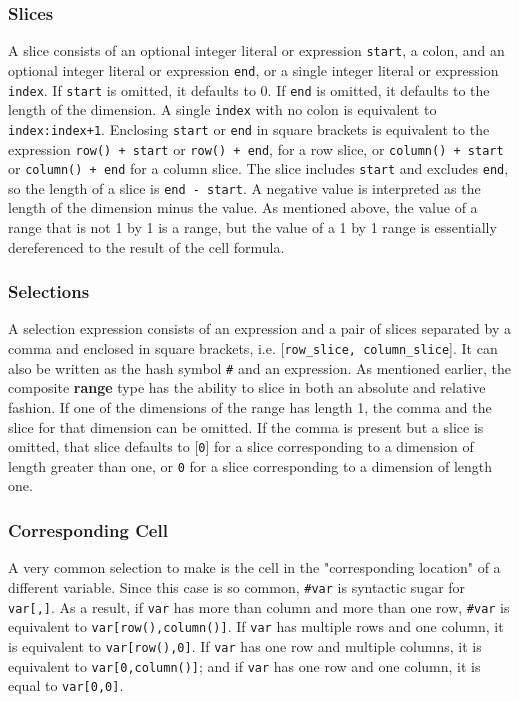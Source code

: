 \subsubsection{Slices}
A slice consists of an optional integer literal or expression \texttt{start}, a colon, and an optional integer literal or expression \texttt{end}, or a single integer literal or expression \texttt{index}. If \texttt{start} is omitted, it defaults to 0. If \texttt{end} is omitted, it defaults to the length of the dimension. A single \texttt{index} with no colon is equivalent to \texttt{index:index+1}. Enclosing \texttt{start} or \texttt{end} in square brackets is equivalent to the expression \texttt{row() + start} or \texttt{row() + end}, for a row slice, or \texttt{column() + start} or \texttt{column() + end} for a column slice. The slice includes \texttt{start} and excludes \texttt{end}, so the length of a slice is \texttt{end - start}. A negative value is interpreted as the length of the dimension minus the value.
			As mentioned above, the value of a range that is not 1 by 1 is a range, but the value of a 1 by 1 range is essentially dereferenced to the result of the cell formula.
\subsubsection{Selections}
A selection expression consists of an expression and a pair of slices separated by a comma and enclosed in square brackets, i.e. {[}\texttt{row\_slice, column\_slice}{]}. It can also be written as the hash symbol \texttt{\#} and an expression. As mentioned earlier, the composite \textbf{range} type has the ability to slice in both an absolute and relative fashion. If one of the dimensions of the range has length 1, the comma and the slice for that dimension can be omitted. If the comma is present but a slice is omitted, that slice defaults to {[}\texttt{0}{]} for a slice corresponding to a dimension of length greater than one, or \texttt{0} for a slice corresponding to a dimension of length one.
\subsubsection{Corresponding Cell}
A very common selection to make is the cell in the "corresponding location" of a different variable. Since this case is so common, \texttt{\#var}
is syntactic sugar for \texttt{var{[},{]}}. As a result, if \texttt{var} has more than column and more than one row, \texttt{\#var} is equivalent to \texttt{var{[}row(),column(){]}}. If \texttt{var} has multiple rows and one column, it is equivalent to \texttt{var{[}row(),0{]}}. If \texttt{var} has one row and multiple columns, it is equivalent to \texttt{var{[}0,column(){]}}; and if \texttt{var} has one row and one column, it is equal to \texttt{var{[}0,0{]}}.

